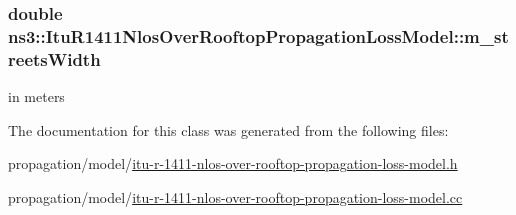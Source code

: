 \subsubsection[{\texorpdfstring{m\+\_\+streets\+Width}{m_streetsWidth}}]{\setlength{\rightskip}{0pt plus 5cm}double ns3\+::\+Itu\+R1411\+Nlos\+Over\+Rooftop\+Propagation\+Loss\+Model\+::m\+\_\+streets\+Width\hspace{0.3cm}{\ttfamily [private]}}\hypertarget{classns3_1_1ItuR1411NlosOverRooftopPropagationLossModel_a7d7efdcbb1640cfa92fb2503722b5981}{}\label{classns3_1_1ItuR1411NlosOverRooftopPropagationLossModel_a7d7efdcbb1640cfa92fb2503722b5981}


in meters 



The documentation for this class was generated from the following files\+:\begin{DoxyCompactItemize}
\item 
propagation/model/\hyperlink{itu-r-1411-nlos-over-rooftop-propagation-loss-model_8h}{itu-\/r-\/1411-\/nlos-\/over-\/rooftop-\/propagation-\/loss-\/model.\+h}\item 
propagation/model/\hyperlink{itu-r-1411-nlos-over-rooftop-propagation-loss-model_8cc}{itu-\/r-\/1411-\/nlos-\/over-\/rooftop-\/propagation-\/loss-\/model.\+cc}\end{DoxyCompactItemize}
